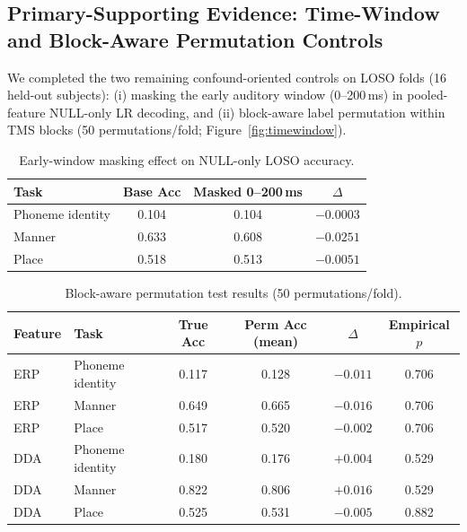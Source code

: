 \documentclass[11pt,a4paper]{article}
\begin{document}
\subsection{Primary-Supporting Evidence: Time-Window and Block-Aware Permutation Controls}

We completed the two remaining confound-oriented controls on LOSO folds (16
held-out subjects): (i) masking the early auditory window (0--200\,ms) in
pooled-feature NULL-only LR decoding, and (ii) block-aware label permutation
within TMS blocks (50 permutations/fold; Figure~\ref{fig:timewindow}).

\begin{table}[H]
\centering
\caption{Early-window masking effect on NULL-only LOSO accuracy.}
\label{tab:timewindow}
\begin{tabular}{lccc}
\toprule
\textbf{Task} & \textbf{Base Acc} & \textbf{Masked 0--200\,ms} &
  $\Delta$ \\
\midrule
Phoneme identity & 0.104 & 0.104 & $-0.0003$ \\
Manner           & 0.633 & 0.608 & $-0.0251$ \\
Place            & 0.518 & 0.513 & $-0.0051$ \\
\bottomrule
\end{tabular}
\end{table}

\begin{table}[H]
\centering
\caption{Block-aware permutation test results (50 permutations/fold).}
\label{tab:permutation}
\begin{tabular}{llcccc}
\toprule
\textbf{Feature} & \textbf{Task} & \textbf{True Acc} &
  \textbf{Perm Acc (mean)} & $\Delta$ & \textbf{Empirical $p$} \\
\midrule
ERP & Phoneme identity & 0.117 & 0.128 & $-0.011$ & 0.706 \\
ERP & Manner           & 0.649 & 0.665 & $-0.016$ & 0.706 \\
ERP & Place            & 0.517 & 0.520 & $-0.002$ & 0.706 \\
DDA & Phoneme identity & 0.180 & 0.176 & $+0.004$ & 0.529 \\
DDA & Manner           & 0.822 & 0.806 & $+0.016$ & 0.529 \\
DDA & Place            & 0.525 & 0.531 & $-0.005$ & 0.882 \\
\bottomrule
\end{tabular}
\end{table}
\end{document}
